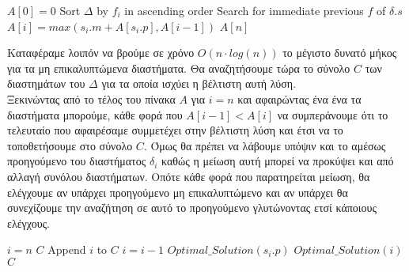 \documentclass{article} \usepackage[greek,english]{babel}
\begin{document}
    \begin{algorithm}
        \caption{$Optimal\_Length(\Delta)$ }
        \begin{algorithmic}[1]
            \State $A[0] = 0$
            \State Sort $\Delta$ by $f_i$ in ascending order 
            \For{$\delta \in \Delta$} 
            \State Search for immediate previous $f$ of $\delta.s$ 
            \EndFor
            $A[i] = max(s_i.m + A[s_i.p], A[i-1])$ 
            \EndFor
            \Return $A[n]$
        \end{algorithmic}
    \end{algorithm}

\pagebreak

Καταφέραμε λοιπόν να βρούμε σε χρόνο $Ο(n\cdot log(n))$ το μέγιστο δυνατό μήκος για τα μη επικαλυπτώμενα
διαστήματα. Θα αναζητήσουμε τώρα το σύνολο $C$ των διαστημάτων του $\Delta$ για τα οποία ισχύει η
βέλτιστη αυτή λύση. \\
Ξεκινώντας από το τέλος του πίνακα $Α$ για $i=n$ και αφαιρώντας ένα ένα τα διαστήματα μπορούμε, κάθε φορά που
$A[i-1] < A[i]$ να συμπεράνουμε ότι το τελευταίο που αφαιρέσαμε συμμετέχει στην βέλτιστη λύση και έτσι
να το τοποθετήσουμε στο σύνολο $C$. Όμως θα πρέπει να λάβουμε υπόψιν και το αμέσως προηγούμενο του
διαστήματος $\delta_i$ καθώς η μείωση αυτή μπορεί να προκύψει και από αλλαγή συνόλου διαστήματων. Οπότε
κάθε φορά που παρατηρείται μείωση, θα ελέγχουμε αν υπάρχει προηγούμενο μη επικαλυπτώμενο και αν υπάρχει
θα συνεχίζουμε την αναζήτηση σε αυτό το προηγούμενο γλυτώνοντας ετσί κάποιους ελέγχους. \\

    \begin{algorithm}
        \caption{$Optimal\_Solution(n)$ }
        \begin{algorithmic}[1]
            \State $i=n$
                \Return $C$
            \EndIf
                \State Append $i$ to $C$
                \State $i=i-1$
                \State $Optimal\_Solution( s_i.p)$
            \Else
                \State $Optimal\_Solution( i)$
            \EndIf
            \Return $C$
        \end{algorithmic}
    \end{algorithm}
\end{document}
